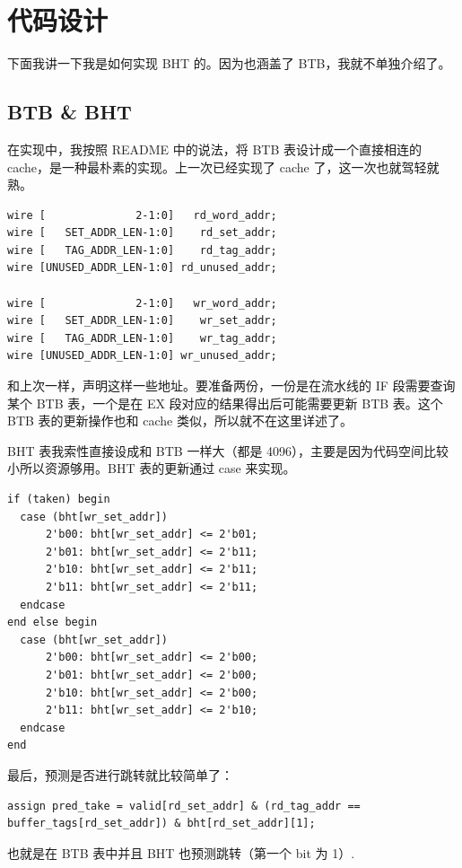 \documentclass{article}
\begin{document}
\section{代码设计}

下面我讲一下我是如何实现 BHT 的。因为也涵盖了 BTB，我就不单独介绍了。

\subsection{BTB \& BHT}

在实现中，我按照 README 中的说法，将 BTB 表设计成一个直接相连的 cache，是一种最朴素的实现。上一次已经实现了 cache 了，这一次也就驾轻就熟。
\begin{verbatim}
wire [              2-1:0]   rd_word_addr;
wire [   SET_ADDR_LEN-1:0]    rd_set_addr;
wire [   TAG_ADDR_LEN-1:0]    rd_tag_addr;
wire [UNUSED_ADDR_LEN-1:0] rd_unused_addr;

wire [              2-1:0]   wr_word_addr;
wire [   SET_ADDR_LEN-1:0]    wr_set_addr;
wire [   TAG_ADDR_LEN-1:0]    wr_tag_addr;
wire [UNUSED_ADDR_LEN-1:0] wr_unused_addr;
\end{verbatim}
和上次一样，声明这样一些地址。要准备两份，一份是在流水线的 IF 段需要查询某个 BTB 表，一个是在 EX 段对应的结果得出后可能需要更新 BTB 表。这个 BTB 表的更新操作也和 cache 类似，所以就不在这里详述了。

BHT 表我索性直接设成和 BTB 一样大（都是 4096），主要是因为代码空间比较小所以资源够用。BHT 表的更新通过 case 来实现。
\begin{verbatim}
if (taken) begin
  case (bht[wr_set_addr])
      2'b00: bht[wr_set_addr] <= 2'b01;
      2'b01: bht[wr_set_addr] <= 2'b11;
      2'b10: bht[wr_set_addr] <= 2'b11;
      2'b11: bht[wr_set_addr] <= 2'b11;
  endcase
end else begin
  case (bht[wr_set_addr])
      2'b00: bht[wr_set_addr] <= 2'b00;
      2'b01: bht[wr_set_addr] <= 2'b00;
      2'b10: bht[wr_set_addr] <= 2'b00;
      2'b11: bht[wr_set_addr] <= 2'b10;
  endcase
end
\end{verbatim}

最后，预测是否进行跳转就比较简单了：
\begin{verbatim}
assign pred_take = valid[rd_set_addr] & (rd_tag_addr == buffer_tags[rd_set_addr]) & bht[rd_set_addr][1];
\end{verbatim}
也就是在 BTB 表中并且 BHT 也预测跳转（第一个 bit 为 1）.
\end{document}
